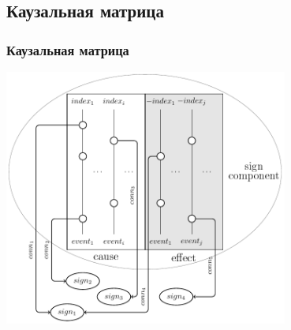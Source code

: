 \documentclass[default]{beamer}
\begin{document}
	\subsection{Каузальная матрица}
	\begin{frame}
		\frametitle{Каузальная матрица}                             
		\centering
		\includegraphics[width=0.7\textwidth]{automata/caus_matr}
		\vspace{10pt}
		\nocite{*}
		\printbibliography[keyword={per}, resetnumbers=true]
	\end{frame}
\end{document}

